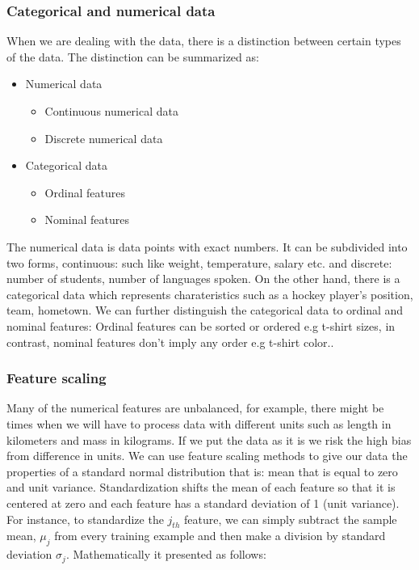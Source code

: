 \documentclass[a4paper,oneside,openright,11pt]{book}
\begin{document}
\subsubsection{Categorical and numerical data}

When we are dealing with the data, there is a distinction between certain types of the data. The distinction can be summarized as:

\begin{itemize}
    \item Numerical data
    \begin{itemize}
        \item Continuous numerical data
        \item Discrete numerical data
    \end{itemize}
    \item Categorical data
    \begin{itemize}
        \item Ordinal features
        \item Nominal features
    \end{itemize}
\end{itemize}

The numerical data is data points with exact numbers. It can be subdivided into two forms, continuous: such like weight, temperature, salary etc. and discrete: number of students, number of languages spoken. On the other hand, there is a categorical data which represents charateristics such as a hockey player’s position, team, hometown. We can further distinguish the categorical data to ordinal and nominal features: Ordinal features can be sorted or ordered e.g t-shirt sizes, in contrast, nominal features don't imply any order e.g t-shirt color.\cite{raschka}\cite{numericalData}.


\subsubsection{Feature scaling}

Many of the numerical features are unbalanced, for example, there might be times when we will have to process data with different units such as length in kilometers and mass in kilograms. If we put the data as it is we risk the high bias from difference in units. We can use feature scaling methods to give our data the properties of a standard normal distribution that is: mean that is equal to zero and unit variance. Standardization shifts the mean of each feature so that it is centered at zero and each feature has a standard deviation of 1 (unit variance). For instance, to standardize the
$j_{th}$ feature, we can simply subtract the sample mean, $\mu_{j}$ from every training example and then make a division by standard deviation $\sigma_{j}$. Mathematically it presented as follows:
\end{document}
